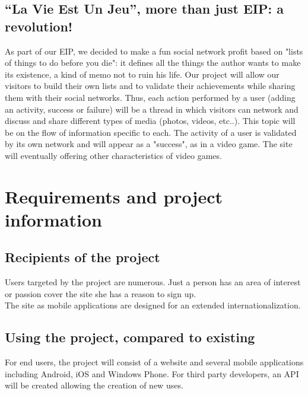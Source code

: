 \documentclass {life-en}
\begin{document}
\section{``La Vie Est Un Jeu'', more than just EIP: a revolution!}

As part of our EIP, we decided to make a fun social network profit based on "lists of things to do before you die": it defines all the things the author wants to make its existence, a kind of memo not to ruin his life. Our project will allow our visitors to build their own lists and to validate their achievements while sharing them with their social networks. Thus, each action performed by a user (adding an activity, success or failure) will be a thread in which visitors can network and discuss and share different types of media (photos, videos, etc..). This topic will be on the flow of information specific to each. The activity of a user is validated by its own network and will appear as a "success", as in a video game. The site will eventually offering other characteristics of video games.


\chapter{Requirements and project information}

\section{Recipients of the project}

Users targeted by the project are numerous. Just a person has an area of interest or passion cover the site she has a reason to sign up.\\

The site as mobile applications are designed for an extended internationalization.

\section{Using the project, compared to existing}

For end users, the project will consist of a website and several mobile applications including Android, iOS and Windows Phone. For third party developers, an API will be created allowing the creation of new uses.\\
\end{document}
